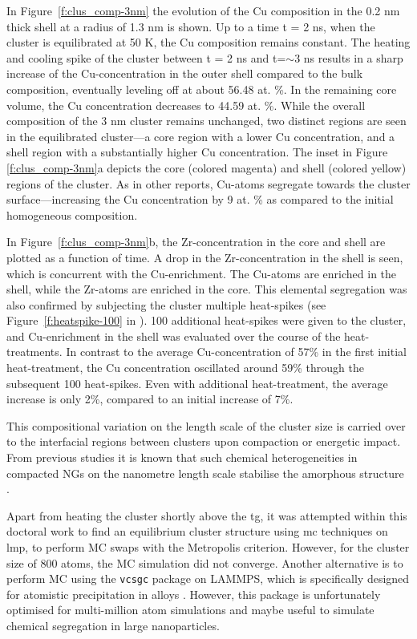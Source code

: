 \begin{changebar}
In Figure~\ref{f:clus_comp-3nm} the evolution of the Cu composition in the 0.2 nm thick shell at a radius of 1.3 nm is shown. Up to a time t = 2 ns, when the cluster is equilibrated at 50 K, the Cu composition remains constant. The heating and cooling spike of the cluster between t = 2 ns and t=$\sim$3 ns results in a sharp increase of the Cu-concentration in the outer shell compared to the bulk composition, eventually leveling off at about 56.48 at. \%. In the remaining core volume, the Cu concentration decreases to 44.59 at. \%. While the overall composition of the 3 nm cluster remains unchanged, two distinct regions are seen in the equilibrated cluster---a core region with a lower Cu concentration, and a shell region with a substantially higher Cu concentration. The inset in Figure \ref{f:clus_comp-3nm}a depicts the core (colored magenta) and shell (colored yellow) regions of the cluster. As in other reports, Cu-atoms segregate towards the cluster surface---increasing the Cu concentration by 9 at. \% as compared to the initial homogeneous composition. \end{changebar} In Figure~\ref{f:clus_comp-3nm}b, the Zr-concentration in the core and shell are plotted as a function of time. A drop in the Zr-concentration in the shell is seen, which is concurrent with the Cu-enrichment. The Cu-atoms are enriched in the shell, while the Zr-atoms are enriched in the core. This elemental segregation was also confirmed by subjecting the cluster multiple heat-spikes (see Figure~\ref{f:heatspike-100} in ). 100 additional heat-spikes were given to the \cz cluster, and Cu-enrichment in the shell was evaluated over the course of the heat-treatments. In contrast to the average Cu-concentration of 57\% in the first initial heat-treatment, the Cu concentration oscillated around 59\% through the subsequent 100 heat-spikes. Even with additional heat-treatment, the average increase is only 2\%, compared to an initial increase of 7\%. \begin{changebar} This compositional variation on the length scale of the cluster size is carried over to the interfacial regions between clusters upon compaction or energetic impact. From previous studies it is known that such chemical heterogeneities in compacted NGs on the nanometre length scale stabilise the amorphous structure \cite{Adjaoud2016}. \par
\end{changebar}

Apart from heating the cluster shortly above the \gls{tg}, it was attempted within this doctoral work to find an equilibrium cluster structure using \gls{mc} techniques on \gls{lmp}, to perform MC swaps with the Metropolis criterion. However, for the cluster size of 800 atoms, the MC simulation did not converge. Another alternative is to perform MC using the \texttt{vcsgc} package on LAMMPS, which is specifically designed for atomistic precipitation in alloys \cite{Sadigh2012}. However, this package is unfortunately optimised for multi-million atom simulations and maybe useful to simulate chemical segregation in large nanoparticles. \par

